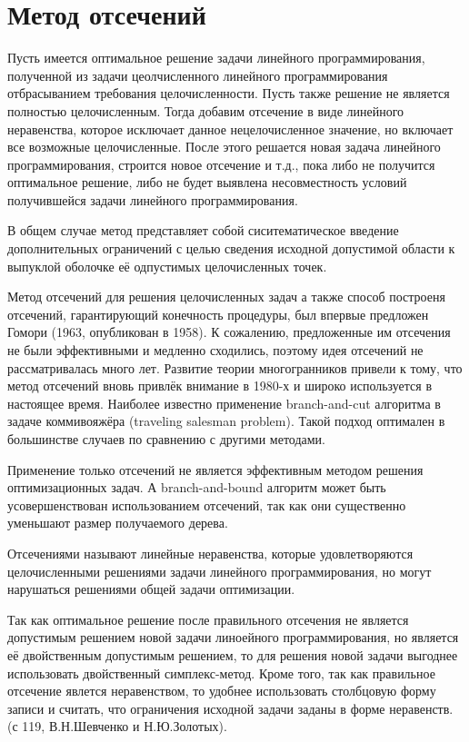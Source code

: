 \documentclass[a4paper,14pt,russian]{extreport}
\begin{document}
\section{Метод отсечений}
Пусть имеется оптимальное решение задачи линейного программирования, полученной из задачи цеолчисленного линейного программирования отбрасыванием требования целочисленности. Пусть также решение не является полностью целочисленным. Тогда добавим отсечение в виде линейного неравенства, которое исключает данное нецелочисленное значение, но включает все возможные целочисленные. После этого решается новая задача линейного программирования, строится новое отсечение и т.д., пока либо не получится оптимальное решение, либо не будет выявлена несовместность условий получившейся задачи линейного программирования. 
\par 
В общем случае метод представляет собой сиситематическое введение дополнительных ограничений с целью сведения исходной допустимой области к выпуклой оболочке её одпустимых целочисленных точек.
\par
Метод отсечений для решения целочисленных задач а также способ построеня отсечений, гарантирующий конечность процедуры, был впервые предложен Гомори (1963, опубликован в 1958). К сожалению, предложенные им отсечения не были эффективными и медленно сходились, поэтому идея отсечений не рассматривалась много лет. Развитие теории многогранников привели к тому, что метод отсечений вновь привлёк внимание в 1980-х и широко используется в настоящее время. Наиболее известно применение branch-and-cut алгоритма в задаче коммивояжёра (traveling salesman problem). Такой подход оптимален в большинстве случаев по сравнению с другими методами. 
\par
Применение только отсечений не является эффективным методом решения оптимизационных задач. А branch-and-bound алгоритм может быть усовершенствован использованием отсечений, так как они существенно уменьшают размер получаемого дерева.
\par
Отсечениями называют линейные неравенства, которые удовлетворяются целочисленными решениями задачи линейного программирования, но могут нарушаться решениями общей задачи оптимизации.
\par
Так как оптимальное решение после правильного отсечения не является допустимым решением новой задачи линоейного программирования, но является её двойственным допустимым решением, то для решения новой задачи выгоднее использовать двойственный симплекс-метод. Кроме того, так как правильное отсечение явлется неравенством, то удобнее использовать столбцовую форму записи и считать, что ограничения исходной задачи заданы в форме неравенств. (с 119, В.Н.Шевченко и Н.Ю.Золотых).
\end{document}
